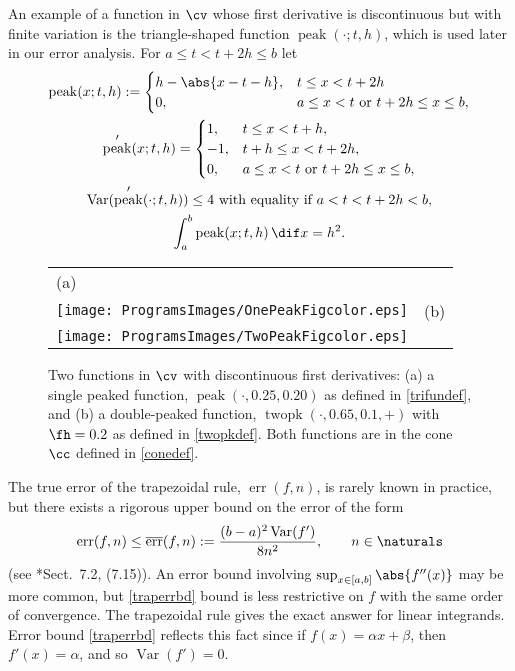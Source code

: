 \documentclass[]{article}
\DeclareMathOperator{\Var}{Var}
\DeclareMathOperator{\err}{err}
\newcommand{\oerr}{\overline{\err}}
\theoremstyle{definition}
\theoremstyle{remark}
\DeclareMathOperator{\tri}{peak}
\DeclareMathOperator{\twopk}{twopk}
\newcommand{\hcut}{\fh}
\begin{document}
An example of a function in $\cv$ whose first derivative is  discontinuous but with finite variation is the triangle-shaped function  $\tri(\cdot;t,h)$, which is used later in our error analysis.  For $a \le t < t+2h \le b$ let 
\begin{subequations} \label{trifundef}
\begin{gather}
\tri(x;t,h):= \begin{cases} h -\abs{x-t-h},  & t \le x < t+2h  \\
0, & a \le x < t \text{ or } t+2h \le x \le b,
\end{cases} \\
\tri'(x;t,h) = \begin{cases} 
1, & t \le x < t+h, \\
-1, & t+h \le x < t+2h, \\
0, & a \le x < t \text{ or } t+2h \le x \le b, 
\end{cases} \\
\label{trifunVar}
\Var(\tri'(\cdot;t,h)) \le 4 \text{ with equality if $a < t  < t+2h < b$}, \\
\label{trifuninteg}
\int_a^b \tri(x;t,h) \, \dif x = h^2.
\end{gather}
\end{subequations}

\begin{figure}
\centering
\begin{tabular}{>{\centering}m{5.5cm}>{\centering}m{5.5cm}}
(a) \\
\texttt{[image: ProgramsImages/OnePeakFigcolor.eps]} &
(b) \\
\texttt{[image: ProgramsImages/TwoPeakFigcolor.eps]} \end{tabular}
\caption{Two functions in $\cv$ with discontinuous first derivatives: (a) a single peaked function, $\tri(\cdot,0.25,0.20)$ as defined in \eqref{trifundef}, and (b) a double-peaked function, $\twopk(\cdot,0.65,0.1,+)$ with $\hcut=0.2$ as defined in \eqref{twopkdef}.  Both functions are in the cone $\cc$ defined in \eqref{conedef}. \label{trianglepeakfig}}
\end{figure}

The true error of the trapezoidal rule, $\err(f,n)$, is rarely known in practice, but there exists a rigorous upper bound on the error of the form 
\begin{equation} \label{traperrbd}
\err(f,n) \le \oerr(f,n):=\frac{(b-a)^2\Var(f')}{8n^2}, \qquad n \in \naturals
\end{equation}
(see *{Sect.\ 7.2, (7.15)}). An error bound involving $\sup_{x \in [a,b]} \abs{f''(x)}$ may be more common, but \eqref{traperrbd} bound is less restrictive on $f$ with the same order of convergence.  The trapezoidal rule gives the exact answer for linear integrands.  Error bound \eqref{traperrbd} reflects this fact since if $f(x)=\alpha x+ \beta$, then $f'(x)=\alpha$, and so $\Var(f')=0$.
\end{document}
